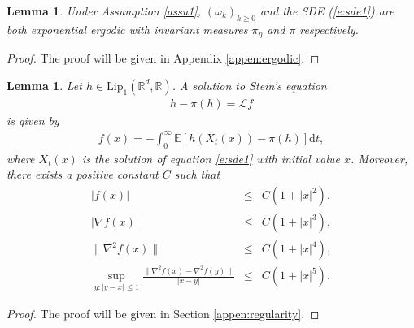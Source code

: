 \documentclass[12pt]{amsart}
\newtheorem{lemma}[theorem]{Lemma}
\newtheorem{lem}[theorem]{Lemma}
\theoremstyle{definition}
\theoremstyle{remark}
\numberwithin{equation}{section}
\newcommand{\dif}{\mathrm{d}}
\newcommand{\E}{\mathbb{E}}            %
\newcommand{\R}{\mathbb{R}}\newcommand{\RR}{\mathbb{R}}
\begin{document}
\begin{lem}  \label{lem:ergodic}
	Under Assumption \ref{assu1}, $(\omega_k)_{k\ge0}$ and the SDE (\ref{e:sde1}) are both exponential ergodic with invariant measures $\pi_\eta$ and $\pi$ respectively.
\end{lem}
\begin{proof}
	The proof will be given in Appendix \ref{appen:ergodic}.	
\end{proof}


\begin{lemma}\label{lem:stein}
	Let $h\in \mathrm{Lip}_1(\R^d,\R)$. A solution to Stein's equation  
	\begin{eqnarray*}
		h-\pi(h)=\mathcal L f
	\end{eqnarray*}
	is given by
	\begin{eqnarray}\label{e:steinsol}
		f(x)=-\int_0^\infty \E[h(X_t(x))-\pi(h)]\dif t,
	\end{eqnarray}
	where $X_t(x)$ is the solution of equation \eqref{e:sde1} with initial value $x$. Moreover, there exists a positive constant $C$ such that
	\begin{eqnarray}
		|f(x)|&\le& C(1+|x|^2),\label{e:regularity1}\\
		|\nabla f(x)|&\le& C(1+|x|^3),\label{e:regularity2}\\
		\|\nabla ^2 f(x)\|&\le& C(1+|x|^4),\label{e:regularity3}\\
		\sup_{y:|y-x|\le1}\frac{\|\nabla ^2 f(x)-\nabla ^2 f(y)\|}{|x-y|}&\le& C(1+|x|^{5}).\label{e:regularity4}
	\end{eqnarray}
\end{lemma}
\begin{proof}
	The proof will be given in Section \ref{appen:regularity}.	
\end{proof}
\end{document}
